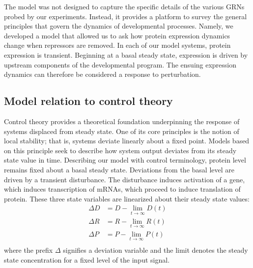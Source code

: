 The model was not designed to capture the specific details of the various GRNs probed by our experiments. Instead, it provides a platform to survey the general principles that govern the dynamics of developmental processes. Namely, we developed a model that allowed us to ask how protein expression dynamics change when repressors are removed. In each of our model systems, protein expression is transient. Beginning at a basal steady state, expression is driven by upstream components of the developmental program. The ensuing expression dynamics can therefore be considered a response to perturbation.

\subsection{Model relation to control theory}

Control theory provides a theoretical foundation underpinning the response of systems displaced from steady state. One of its core principles is the notion of local stability; that is, systems deviate linearly about a fixed point. Models based on this principle seek to describe how system output deviates from its steady state value in time. Describing our model with control terminology, protein level remains fixed about a basal steady state. Deviations from the basal level are driven by a transient disturbance. The disturbance induces activation of a gene, which induces transcription of mRNAs, which proceed to induce translation of protein. These three state variables are linearized about their steady state values:
\begin{equation}
\label{metabolism:model:deviations}
\begin{aligned}
\Delta D &= D - \lim_{t \to \infty} D(t) \\
\Delta R &= R - \lim_{t \to \infty} R(t) \\
\Delta P &= P - \lim_{t \to \infty} P(t) \\
\end{aligned}
\end{equation}
where the prefix $\Delta$ signifies a deviation variable and the limit denotes the steady state concentration for a fixed level of the input signal.

